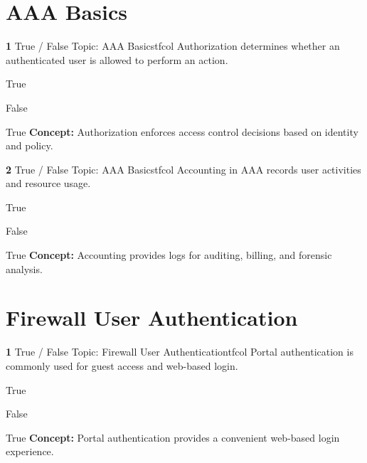\documentclass[10pt,a4paper]{article}
\begin{document}
\section{AAA Basics}
\begin{qcard}{\color{white}\textbf{1} \hfill \small True / False \textbar{} Topic: AAA Basics}{tfcol}
Authorization determines whether an authenticated user is allowed to perform an action.

\begin{qoptions}
\item True
\item False
\end{qoptions}
\begin{explainbox}{True}
\textbf{Concept:} Authorization enforces access control decisions based on identity and policy.
\end{explainbox}
\end{qcard}

\begin{qcard}{\color{white}\textbf{2} \hfill \small True / False \textbar{} Topic: AAA Basics}{tfcol}
Accounting in AAA records user activities and resource usage.

\begin{qoptions}
\item True
\item False
\end{qoptions}
\begin{explainbox}{True}
\textbf{Concept:} Accounting provides logs for auditing, billing, and forensic analysis.
\end{explainbox}
\end{qcard}

\section{Firewall User Authentication}
\begin{qcard}{\color{white}\textbf{1} \hfill \small True / False \textbar{} Topic: Firewall User Authentication}{tfcol}
Portal authentication is commonly used for guest access and web-based login.

\begin{qoptions}
\item True
\item False
\end{qoptions}
\begin{explainbox}{True}
\textbf{Concept:} Portal authentication provides a convenient web-based login experience.
\end{explainbox}
\end{qcard}
\end{document}

